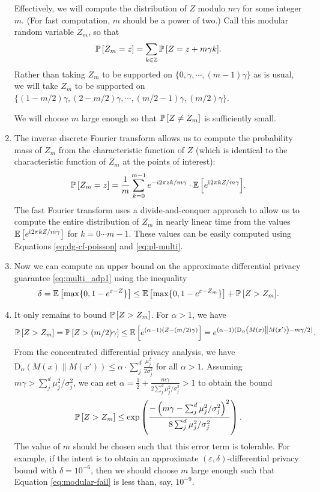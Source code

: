 \documentclass{jpcfinal} %
\newcommand{\ii}{\mathrm{i}\mkern1mu}
\newcommand{\ex}[2]{{\ifx&#1& \mathbb{E} \else
\underset{#1}{\mathbb{E}} \fi \left[#2\right]}}
\newcommand{\pr}[2]{{\ifx&#1& \mathbb{P} \else
\underset{#1}{\mathbb{P}} \fi \left[#2\right]}}
\newcommand{\dr}[3]{\mathrm{D}_{#1}\left(#2\middle\|#3\right)}
\newcommand{\eps}{\varepsilon}
\newcommand{\Z}{\mathbb{Z}}
\begin{document}
\begin{enumerate}
    Effectively, we will compute the distribution of $Z$ modulo $m\gamma$ for some integer $m$. (For fast computation, $m$ should be a power of two.) Call this modular random variable $Z_m$, so that \[\pr{}{Z_m=z} = \sum_{k \in \Z} \pr{}{Z=z+m\gamma k}.\]
    Rather than taking $Z_m$ to be supported on $\{0,\gamma,\cdots,(m-1)\gamma\}$ as is usual, we will take $Z_m$ to be supported on $\{(1-m/2)\gamma,(2-m/2)\gamma, \cdots, (m/2-1)\gamma,(m/2)\gamma\}$.
    
    We will choose $m$ large enough so that $\pr{}{Z \ne Z_m}$ is sufficiently small.
    
    \item The inverse discrete Fourier transform allows us to compute the probability mass of $Z_m$ from the characteristic function of $Z$ (which is identical to the characteristic function of $Z_m$ at the points of interest):
    \begin{equation}
        \pr{}{Z_m=z} = \frac{1}{m} \sum_{k=0}^{m-1} e^{-i 2\pi zk / m\gamma} \cdot \ex{}{e^{\ii{} 2\pi k Z/m\gamma}}.\\
    \end{equation}
    The fast Fourier transform uses a divide-and-conquer approach to allow us to compute the entire distribution of $Z_m$ in nearly linear time from the values $\ex{}{e^{\ii{}2\pi k Z / m\gamma}}$ for $k=0 \cdots m-1$. These values can be easily computed using Equations \ref{eq:dg-cf-poisson} and \ref{eq:pl-multi}.
    
    \item Now we can compute an upper bound on the approximate differential privacy guarantee \eqref{eq:multi_adp1} using the inequality
    \begin{equation}
        \delta = \ex{}{\max\{0, 1-e^{\eps-Z}\}} \le \ex{}{\max\{0, 1-e^{\eps-Z_m}\}} + \pr{}{Z>Z_m}.
    \end{equation}
    
    \item It only remains to bound $\pr{}{Z>Z_m}$. For $\alpha>1$, we have
    \begin{equation}
        \pr{}{Z>Z_m} = \pr{}{Z > (m/2)\gamma} \le \ex{}{e^{(\alpha-1)(Z-(m/2)\gamma)}} = e^{(\alpha-1)(\dr{\alpha}{M(x)}{M(x')} -m \gamma /2 )}.
    \end{equation}
    From the concentrated differential privacy analysis, we have $\dr{\alpha}{M(x)}{M(x')} \le \alpha \cdot \sum_j^d \frac{\mu_j^2}{2\sigma_j^2}$ for all $\alpha>1$. Assuming $m\gamma > \sum_j^d \mu_j^2/\sigma_j^2$, we can set $\alpha = \frac12 + \frac{m\gamma}{2\sum_j^d \mu_j^2/\sigma_j^2}>1$ to obtain the bound 
    \begin{equation}
        \pr{}{Z>Z_m} \le \exp\left(\frac{-\left(m\gamma - \sum_j^d \mu_j^2/\sigma_j^2\right)^2}{8\sum_j^d \mu_j^2/\sigma_j^2}\right).\label{eq:modular-fail}
    \end{equation}
    The value of $m$ should be chosen such that this error term is tolerable. For example, if the intent is to obtain an approximate $(\eps,\delta)$-differential privacy bound with $\delta=10^{-6}$, then we should choose $m$ large enough such that Equation \ref{eq:modular-fail} is less than, say, $10^{-9}$.
    

\end{enumerate}
\end{document}
